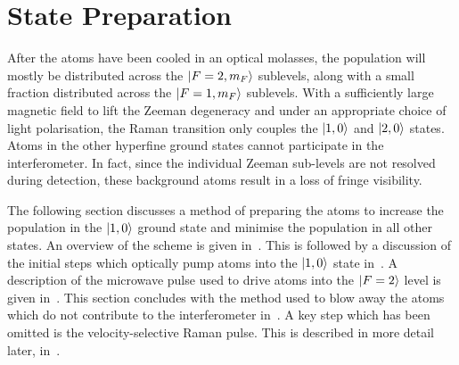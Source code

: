 \section{State Preparation}\label{sec:state_prep}
After the atoms have been cooled in an optical molasses, the
population will mostly be distributed across the \(\ket{F=2,m_F}\)
sublevels,
along with a small fraction distributed across the \(\ket{F=1,m_F}\)
sublevels. With a sufficiently large magnetic field to lift the Zeeman
degeneracy and under an appropriate choice of light polarisation, the Raman transition only couples the \(\ket{1,0}\) and
\(\ket{2,0}\) states. Atoms in the other hyperfine ground states
cannot participate in the interferometer. In fact, since the
individual Zeeman sub-levels are not resolved during detection, these
background atoms result in a loss of fringe visibility.  
\par\noindent
The following section discusses a method of preparing the atoms to
increase the population in the \(\ket{1,0}\) ground state and minimise
the population in all other states. An overview
of the scheme is given in~. This is
followed by a discussion of the initial steps which optically pump
atoms into the \(\ket{1,0}\) state
in~. A description of the microwave
pulse used to drive atoms into the \(\ket{F=2}\) level is given
in~. This section concludes with the
method used to blow away the atoms which do not contribute to the
interferometer in~. A key step which has
been omitted is the velocity-selective Raman pulse. This is described
in more detail later, in~.
